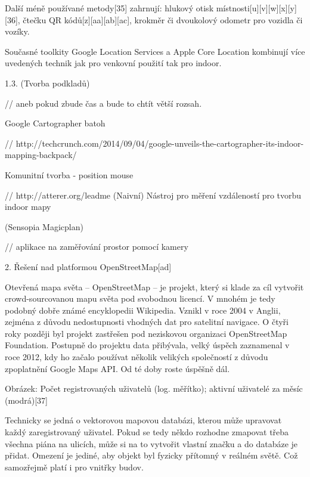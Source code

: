 Další méně používané metody[35] zahrnují: hlukový otisk místnosti[u][v][w][x][y][36], čtečku QR kódů[z][aa][ab][ac], krokměr či dvoukolový odometr pro vozidla či vozíky.

Současné toolkity Google Location Services a Apple Core Location kombinují více uvedených technik jak pro venkovní použití tak pro indoor.

1.3. (Tvorba podkladů)



// aneb pokud zbude čas a bude to chtít větší rozsah.

Google Cartographer batoh



// http://techcrunch.com/2014/09/04/google-unveils-the-cartographer-its-indoor-mapping-backpack/

Komunitní tvorba - position mouse



// http://atterer.org/leadme (Naivní) Nástroj pro měření vzdáleností pro tvorbu indoor mapy

 

(Sensopia Magicplan)



// aplikace na zaměřování prostor pomocí kamery

2. Řešení nad platformou OpenStreetMap[ad]



Otevřená mapa světa – OpenStreetMap – je projekt, který si klade za cíl vytvořit crowd-sourcovanou mapu světa pod svobodnou licencí. V mnohém je tedy podobný dobře známé encyklopedii Wikipedia. Vznikl v roce 2004 v Anglii, zejména z důvodu nedostupnosti vhodných dat pro satelitní navigace. O čtyři roky později byl projekt zastřešen pod neziskovou organizaci OpenStreetMap Foundation. Postupně do projektu data přibývala, velký úspěch zaznamenal v roce 2012, kdy ho začalo používat několik velikých společností z důvodu zpoplatnění Google Maps API. Od té doby roste úspěšně dál.



Obrázek: Počet registrovaných uživatelů (log. měřítko); aktivní uživatelé za měsíc (modrá)[37]

Technicky se jedná o vektorovou mapovou databázi, kterou může upravovat každý zaregistrovaný uživatel. Pokud se tedy někdo rozhodne zmapovat třeba všechna piána na ulicích, může si na to vytvořit vlastní značku a do databáze je přidat. Omezení je jediné, aby objekt byl fyzicky přítomný v reálném světě. Což samozřejmě platí i pro vnitřky budov.

